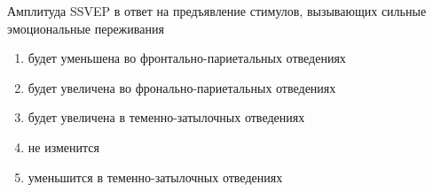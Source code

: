 
Амплитуда SSVEP  в ответ на предъявление стимулов, вызывающих сильные эмоциональные переживания

\begin{enumerate}
    \item будет уменьшена во фронтально-париетальных отведениях
    \item будет увеличена во фронально-париетальных отведениях
    \item будет увеличена в теменно-затылочных отведениях
    \item не изменится
    \item уменьшится в теменно-затылочных отведениях
\end{enumerate}